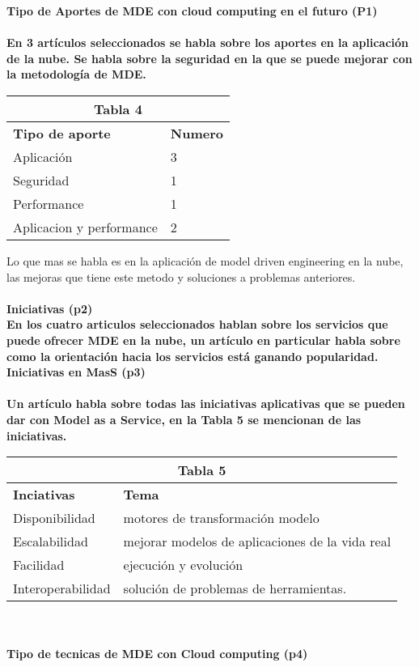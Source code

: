 \documentclass{llncs}
\begin{document}
\bf Tipo de Aportes de MDE con cloud computing en el futuro (P1) \\ \\
En 3 artículos seleccionados se habla sobre los aportes en la aplicación de la nube. Se habla sobre la seguridad en la que se puede mejorar con la metodología de MDE.

\begin{tabular}{  | p{5cm} | p{3cm} |}
  \hline
  \multicolumn{2}{|c|}{\bf Tabla 4} \\
  \hline
  \bf Tipo de aporte  & \bf Numero \\
  \hline
  Aplicación & 3 \\
  \hline
  Seguridad & 1 \\
  \hline
   Performance & 1 \\
   \hline
   Aplicacion y performance & 2 \\
   \hline
\end{tabular}
\clearpage


Lo que mas se habla es en la aplicación de model driven engineering en la nube, las mejoras que tiene este metodo y soluciones a problemas anteriores. \\ \\
\bf Iniciativas (p2) \\
En los cuatro articulos seleccionados hablan sobre los servicios que puede ofrecer MDE en la nube, un artículo en particular habla sobre como  la orientación hacia los servicios está ganando popularidad.
\\
\bf Iniciativas en MasS (p3) \\ \\
Un artículo habla sobre todas las iniciativas aplicativas que se pueden dar con Model as a Service, en la Tabla 5 se mencionan de las iniciativas.
\begin{tabular}{  | p{4cm} | p{7cm} |}
  \hline
  \multicolumn{2}{|c|}{\bf Tabla 5} \\
  \hline
  \bf Inciativas  & \bf Tema \\
  \hline
   Disponibilidad & motores de transformación modelo \\
  \hline
   Escalabilidad & mejorar modelos de aplicaciones de la vida real \\
  \hline
   Facilidad & ejecución y evolución \\
  \hline
   Interoperabilidad & solución de problemas de herramientas. \\
  \hline
\end{tabular} \\ \\
\bf Tipo de tecnicas de MDE con Cloud computing (p4)\\ \\
\end{document}
